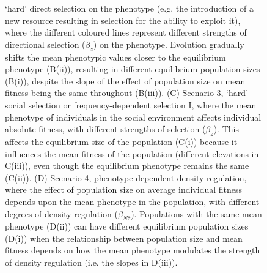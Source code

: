 \documentclass{article}
\begin{document}
\begin{figure} [H]
{`hard' direct selection on the phenotype (e.g. the introduction of a new resource resulting in selection for the ability to exploit it), where the different coloured lines represent different strengths of directional selection ($\beta_{{z}}$) on the phenotype. Evolution gradually shifts the mean phenotypic values closer to the equilibrium phenotype (B(ii)), resulting in different equilibrium population sizes (B(i)), despite the slope of the effect of population size on mean fitness being the same throughout (B(iii)). (C) Scenario 3, 
`hard' social selection or frequency-dependent selection I, where the mean phenotype of individuals in the social environment affects individual absolute fitness, with different strengths of selection ($\beta_{\bar{z}}$). This affects the equilibrium size of the population (C(i)) because it influences the mean fitness of the population (different elevations in C(iii)), even though the equilibrium phenotype remains the same (C(ii)). (D) Scenario 4, phenotype-dependent density regulation, where the effect of population size on average individual fitness depends upon the mean phenotype in the population, with different degrees of density regulation ($\beta_{{N\bar{z}}}$). Populations with the same mean phenotype (D(ii)) can have different equilibrium population sizes (D(i)) when the relationship between population size and mean fitness depends on how the mean phenotype modulates the strength of density regulation (i.e. the slopes in D(iii)).}
	\label{fig:sim2}
\end{figure}
\end{document}
